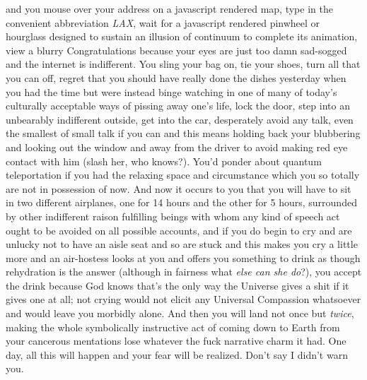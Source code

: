 \documentclass{article}
\begin{document}
and you mouse over your address on a javascript rendered map, type in
the convenient abbreviation \textit{LAX}, wait for a javascript rendered
pinwheel or hourglass designed to sustain an illusion of continuum to
complete its animation, view a blurry Congratulations because your eyes
are just too damn sad-sogged and the internet is indifferent. You sling
your bag on, tie your shoes, turn all that you can off, regret that you
should have really done the dishes yesterday when you had the time but
were instead binge watching in one of many of today's culturally
acceptable ways of pissing away one's life, lock the door, step into an
unbearably indifferent outside, get into the car, desperately avoid any
talk, even the smallest of small talk if you can and this means holding
back your blubbering and looking out the window and away from the driver
to avoid making red eye contact with him (slash her, who knows?). You'd
ponder about quantum teleportation if you had the relaxing space and
circumstance which you so totally are not in possession of now. And now
it occurs to you that you will have to sit in two different airplanes,
one for 14 hours and the other for 5 hours, surrounded by other
indifferent raison fulfilling beings with whom any kind of speech act
ought to be avoided on all possible accounts, and if you do begin to cry
and are unlucky not to have an aisle seat and so are stuck and this
makes you cry a little more and an air-hostess looks at you and offers
you something to drink as though rehydration is the answer (although in
fairness what \textit{else can she do}?), you accept the drink because
God knows that's the only way the Universe gives a shit if it gives one
at all; not crying would not elicit any Universal Compassion whatsoever
and would leave you morbidly alone. And then you will land not once but
\textit{twice}, making the whole symbolically instructive act of coming
down to Earth from your cancerous mentations lose whatever the fuck
narrative charm it had. One day, all this will happen and your fear will
be realized. Don't say I didn't warn you.
\end{document}
